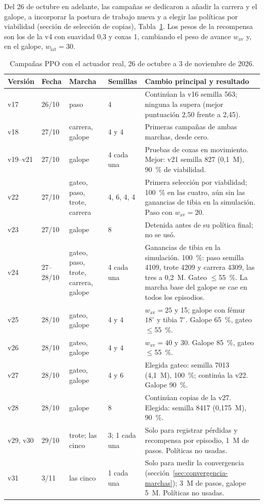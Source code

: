Del 26 de octubre en adelante, las campañas se dedicaron a añadir la carrera y el
galope, a incorporar la postura de trabajo nueva y a elegir las políticas por
viabilidad (sección de selección de copias), Tabla~\ref{tab:campanas-ppo-2}. Los
pesos de la recompensa son los de la v4 con suavidad 0,3 y coxas 1, cambiando el
peso de avance $w_{\text{av}}$ y, en el galope, $w_{\text{lat}}=30$.

\begin{table}[H]
\centering
\caption{Campañas PPO con el actuador real, 26 de octubre a 3 de noviembre de 2026.}
\label{tab:campanas-ppo-2}
\scriptsize
\setlength{\tabcolsep}{3pt}
\begin{tabular}{p{}p{}p{}p{}p{}}
\toprule
Versión & Fecha & Marcha & Semillas & Cambio principal y resultado \\
\midrule
v17 & 26/10 & paso & 4 & Continúan la v16 semilla 563; ninguna la supera (mejor puntuación 2,50 frente a 2,45). \\
v18 & 27/10 & carrera, galope & 4 y 4 & Primeras campañas de ambas marchas, desde cero. \\
v19--v21 & 27/10 & galope & 4 cada una & Pruebas de coxas en movimiento. Mejor: v21 semilla 827 (0,1~M), 90~\% de viabilidad. \\
v22 & 27/10 & gateo, paso, trote, carrera & 4, 6, 4, 4 & Primera selección por viabilidad; 100~\% en las cuatro, aún sin las ganancias de tibia en la simulación. Paso con $w_{\text{av}}=20$. \\
v23 & 27/10 & galope & 8 & Detenida antes de su política final; no se usó. \\
v24 & 27--28/10 & gateo, paso, trote, carrera, galope & 4 cada una & Ganancias de tibia en la simulación. 100~\%: paso semilla 4109, trote 4209 y carrera 4309, las tres a 0,2~M. Gateo $\leq$55~\%. La marcha base del galope se cae en todos los episodios. \\
v25 & 28/10 & gateo, galope & 4 y 4 & $w_{\text{av}}=25$ y 15; galope con fémur $18^\circ$ y tibia $7^\circ$. Galope 65~\%, gateo $\leq$55~\%. \\
v26 & 28/10 & gateo, galope & 4 y 4 & $w_{\text{av}}=40$ y 30. Galope 85~\%, gateo $\leq$55~\%. \\
v27 & 28/10 & gateo, galope & 4 y 6 & Elegida gateo: semilla 7013 (4,1~M), 100~\%; continúa la v22. Galope 90~\%. \\
v28 & 28/10 & galope & 8 & Continúan copias de la v27. Elegida: semilla 8417 (0,175~M), 90~\%. \\
v29, v30 & 29/10 & trote; las cinco & 3; 1 cada una & Solo para registrar pérdidas y recompensa por episodio, 1~M de pasos. Políticas no usadas. \\
v31 & 3/11 & las cinco & 1 cada una & Solo para medir la convergencia (sección~\ref{sec:convergencia-marchas}); 3~M de pasos, galope 5~M. Políticas no usadas. \\
\bottomrule
\end{tabular}
\end{table}

